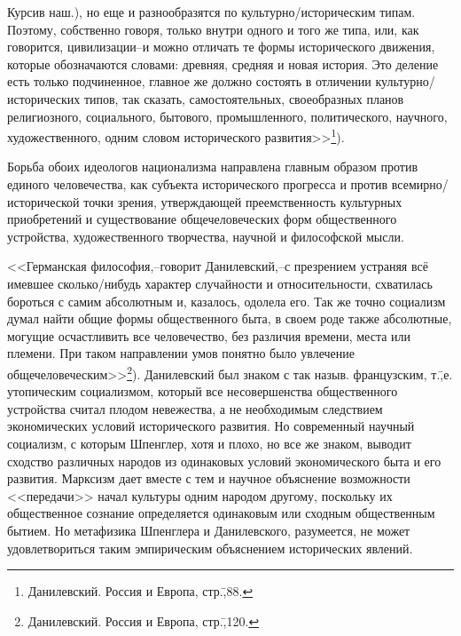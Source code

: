 {Курсив наш.}), но еще и разнообразятся по культурно\-/историческим типам. Поэтому, собственно говоря, только внутри одного и того же типа, или, как говорится, цивилизации\---и можно отличать те формы исторического движения, которые обозначаются словами: древняя, средняя и новая история. Это деление есть только подчиненное, главное же должно состоять в отличении культурно\-/исторических типов, так сказать, самостоятельных, своеобразных планов религиозного, социального, бытового, промышленного, политического, научного, художественного, одним словом исторического развития>>\footnote{Данилевский. Россия и Европа, стр.\=,88.}).

Борьба обоих идеологов национализма направлена главным образом против единого человечества, как субъекта исторического прогресса и против всемирно\-/исторической точки зрения, утверждающей преемственность культурных приобретений и существование общечеловеческих форм общественного устройства, художественного творчества, научной и философской мысли.

<<Германская философия,\---говорит Данилевский,\---с презрением устраняя всё имевшее сколько\-/нибудь характер случайности и относительности, схватилась бороться с самим абсолютным и, казалось, одолела его. Так же точно социализм думал найти общие формы общественного быта, в своем роде также абсолютные, могущие осчастливить все человечество, без различия времени, места или племени. При таком направлении умов понятно было увлечение общечеловеческим>>\footnote{Данилевский. Россия и Европа, стр.\=,120.}). Данилевский был знаком с так назыв. французским, т.\=,е. утопическим социализмом, который все несовершенства общественного устройства считал плодом невежества, а не необходимым следствием экономических условий исторического развития. Но современный научный социализм, с которым Шпенглер, хотя и плохо, но все же знаком, выводит сходство различных народов из одинаковых условий экономического быта и его развития. Марксизм дает вместе с тем и научное объяснение возможности <<передачи>> начал культуры одним народом другому, поскольку их общественное сознание определяется одинаковым или сходным общественным бытием. Но метафизика Шпенглера и Данилевского, разумеется, не может удовлетвориться таким эмпирическим объяснением исторических явлений.

